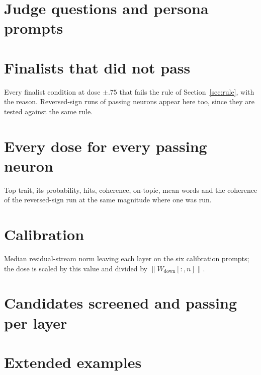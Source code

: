 \documentclass[11pt]{article}
\newcommand{\Wdown}{W_{\mathrm{down}}}
\begin{document}
\section{Judge questions and persona prompts}\label{app:judge}

\section{Finalists that did not pass}\label{app:failed}
Every finalist condition at dose $\pm.75$ that fails the rule of Section~\ref{sec:rule}, with the reason.
Reversed-sign runs of passing neurons appear here too, since they are tested against the same rule.
\begin{center}\scriptsize\end{center}
\section{Every dose for every passing neuron}\label{app:doses}
Top trait, its probability, hits, coherence, on-topic, mean words and the coherence of the reversed-sign run
at the same magnitude where one was run.
\begin{center}\scriptsize\end{center}
\section{Calibration}\label{app:calib}
Median residual-stream norm leaving each layer on the six calibration prompts; the dose is scaled by this
value and divided by $\|\Wdown[:,n]\|$.
\begin{center}\small\end{center}
\section{Candidates screened and passing per layer}\label{app:layers}
\begin{center}\small\end{center}
\section{Extended examples}\label{app:examples}

\end{document}
